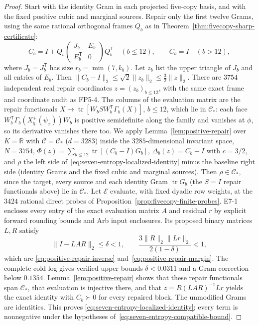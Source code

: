 \begin{proof}
Start with the identity Gram in each projected five-copy basis, and
with the fixed positive cubic and marginal sources. Repair only the
first twelve Grams, using the same rational orthogonal frames $Q_b$ as in
Theorem~\ref{thm:fivecopy-sharp-certificate}:
\[
 C_b=I+Q_b\begin{pmatrix}J_b&E_b\\E_b^{\mathsf T}&0\end{pmatrix}Q_b^{\mathsf T}
 \quad(b\le12),\qquad C_b=I\quad(b>12),
\]
where $J_b=J_b^{\mathsf T}$ has size $r_b=\min(7,k_b)$.
Let $z_b$ list the upper triangle of $J_b$ and all entries of $E_b$.
Then $\|C_b-I\|_2\le\sqrt2\|z_b\|_2\le\tfrac32\|z\|_2$.
There are $3754$ independent real repair coordinates $z=(z_b)_{b\le12}$,
with the same exact frame and coordinate audit as FP5-4.
The columns of the evaluation matrix are the repair functionals
$X\mapsto\operatorname{tr}[W_bSW_b^{\mathsf T}\Gamma_b(X)]$, $b\le12$, which
lie in $\mathcal C_*$: each face $W_b^{\mathsf T}\Gamma_b(X_5^+(\psi_x))W_b$ is
positive semidefinite along the family and vanishes at $\phi$, so its
derivative vanishes there too.
We apply Lemma~\ref{lem:positive-repair} over $K=\mathbb R$ with
$\mathcal C=\mathcal C_*$ ($d=3283$) inside the $3285$-dimensional invariant space, $N=3754$,
$\Phi(z)=\sum_{b\le12}\operatorname{tr}[(C_b-I)G_b]$,
$\Delta_b(z)=C_b-I$ with $c=3/2$, and $\rho$ the left side
of~\eqref{eq:seven-entropy-localized-identity} minus the baseline right side
(identity Grams and the fixed cubic and marginal sources). Then
$\rho\in\mathcal C_*$, since the target, every source and each identity Gram $\operatorname{tr}G_b$ (the $S=I$ repair functionals above) lie in $\mathcal C_*$.
Let $\mathcal E$ evaluate, with fixed dyadic row weights, at the $3424$ rational direct probes of
Proposition~\ref{prop:fivecopy-finite-probes}. E7-1 encloses every
entry of the exact evaluation matrix $A$ and residual $r$ by explicit
forward rounding bounds and Arb input enclosures. Its proposed binary
matrices $L,R$ satisfy
\[
 \|I-LAR\|_2\le\delta<1,\qquad
 \frac{3\|R\|_2\|Lr\|_2}{2(1-\delta)}<1,
\]
which are \eqref{eq:positive-repair-inverse} and~\eqref{eq:positive-repair-margin}.
The complete cold log gives verified upper bounds $\delta<0.0311$ and
a Gram correction below $0.1354$.
Lemma~\ref{lem:positive-repair} shows that these repair functionals span
$\mathcal C_*$, that evaluation is injective there, and that
$z=R(LAR)^{-1}Lr$ yields the exact identity with $C_b\succ0$ for every repaired
block. The unmodified Grams are identities. This proves
\eqref{eq:seven-entropy-localized-identity}; every term is nonnegative
under the hypotheses of~\eqref{eq:seven-entropy-compatible-bound}.
\end{proof}

